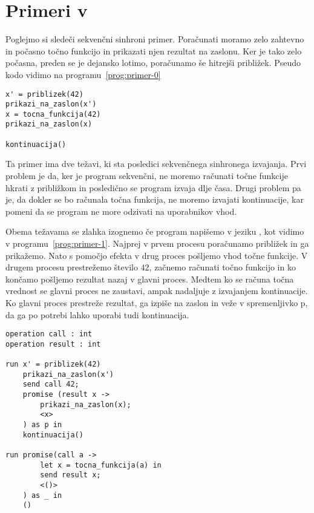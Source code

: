 \section{Primeri v \aeff{}} \label{sec:primeri-aeff}

Poglejmo si sledeči sekvenčni sinhroni primer. Poračunati moramo zelo zahtevno in počasno točno funkcijo in prikazati njen rezultat na zaslonu. Ker je tako zelo počasna, preden se je dejansko lotimo, poračunamo še hitrejši približek. Pseudo kodo vidimo na programu~\ref{prog:primer-0}

\begin{lstlisting}[caption={Sinhron sekvečni primer.},label={prog:primer-0},float,floatplacement=h]
x' = priblizek(42)
prikazi_na_zaslon(x')
x = tocna_funkcija(42)
prikazi_na_zaslon(x)

kontinuacija()
\end{lstlisting}

Ta primer ima dve težavi, ki sta posledici sekvenčnega sinhronega izvajanja. Prvi problem je da, ker je program sekvenčni, ne moremo računati točne funkcije hkrati z približkom in posledično se program izvaja dlje časa. Drugi problem pa je, da dokler se bo računala točna funkcija, ne moremo izvajati kontinuacije, kar pomeni da se program ne more odzivati na uporabnikov vhod.  

Obema težavama se zlahka izognemo če program napišemo v jeziku \aeff, kot vidimo v programu~\ref{prog:primer-1}. Najprej v prvem procesu poračunamo približek in ga prikažemo. Nato s pomočjo efekta v drug proces pošljemo vhod točne funkcije. V drugem procesu prestrežemo število $42$, začnemo računati točno funkcijo in ko končamo pošljemo rezultat nazaj v glavni proces. Medtem ko se računa točna vrednost se glavni proces ne zaustavi, ampak nadaljuje z izvajanjem kontinuacije. Ko glavni proces prestreže rezultat, ga izpiše na zaslon in veže v spremenljivko p, da ga po potrebi lahko uporabi tudi kontinuacija.

\begin{lstlisting}[caption={Asinhron Vzporeden primer.},label={prog:primer-1},float,floatplacement=h]
operation call : int
operation result : int
 
run x' = priblizek(42)
	prikazi_na_zaslon(x')
	send call 42;
	promise (result x ->
		prikazi_na_zaslon(x);
		<x>
	) as p in
	kontinuacija()

run promise(call a ->
		let x = tocna_funkcija(a) in
		send result x;
		<()>
	) as _ in
	()
\end{lstlisting}
